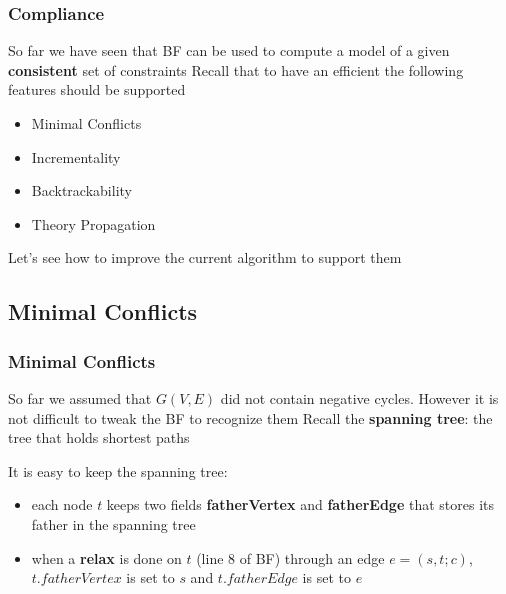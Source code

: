 \begin{frame}
  \frametitle{\tsolver Compliance}

  So far we have seen that BF can be used
  to compute a model of a given {\bf consistent}
  set of \Idl constraints
  \vfill
  Recall that to have an efficient \tsolver
  the following features should be supported
  \vfill
  \begin{itemize}
    \item Minimal Conflicts
  \vfill
    \item Incrementality
  \vfill
    \item Backtrackability
  \vfill
    \item Theory Propagation
  \end{itemize}
  \vfill
  Let's see how to improve the current algorithm to
  support them

\end{frame}

\subsection{Minimal Conflicts}

\begin{frame}
  \frametitle{Minimal Conflicts}

  So far we assumed that $G(V,E)$ did not contain
  negative cycles. However it is not difficult to
  tweak the BF to recognize them
  \vfill
  \pause
  Recall the {\bf spanning tree}: the tree that holds
  shortest paths 
  \vfill
  \begin{center}
    
  \end{center}
  \vfill
  \pause
  It is easy to keep the spanning tree:
  \begin{itemize}
    \item each node $t$ keeps two fields {\bf fatherVertex}
	  and {\bf fatherEdge} that stores its father 
          in the spanning tree
    \item when a {\bf relax} is done on $t$ (line 8 of BF)
	  through an edge $e = (s, t; c)$, $t.fatherVertex$ is
	  set to $s$ and $t.fatherEdge$ is set to $e$
  \end{itemize}

\end{frame}

